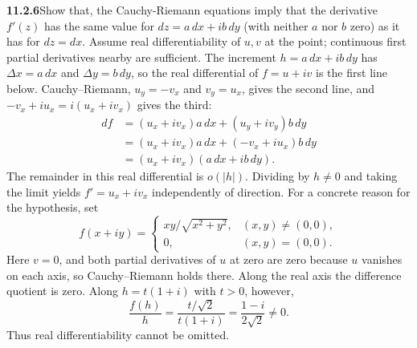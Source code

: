 \par\bigskip
\noindent\textbf{11.2.6}\quad Show that,  the Cauchy-Riemann equations imply that
the derivative $f'(z)$ has the same value for $dz=a\,dx+ib\,dy$ (with neither
$a$ nor $b$ zero) as it has for $dz=dx$.
\solution
Assume real differentiability of $u,v$ at the point; continuous
first partial derivatives nearby are sufficient. The increment
$h=a\,dx+ib\,dy$ has $\Delta x=a\,dx$ and $\Delta y=b\,dy$, so the
real differential of $f=u+iv$ is the first line below.
Cauchy--Riemann, $u_y=-v_x$ and $v_y=u_x$, gives the second line, and
$-v_x+iu_x=i(u_x+iv_x)$ gives the third:
\[
\begin{aligned}
df&=(u_x+iv_x)a\,dx+(u_y+iv_y)b\,dy\\
&=(u_x+iv_x)a\,dx+(-v_x+iu_x)b\,dy\\
&=(u_x+iv_x)(a\,dx+ib\,dy).
\end{aligned}
\]
The remainder in this real differential is $o(|h|)$.
Dividing by $h\ne0$ and taking the limit yields
$\boxed{f'=u_x+iv_x}$ independently of direction.
For a concrete reason for the hypothesis, set
\[
f(x+iy)=\begin{cases}xy/\sqrt{x^2+y^2},&(x,y)\ne(0,0),\\0,&(x,y)=(0,0).\end{cases}
\]
Here $v=0$, and both partial derivatives of $u$ at zero are zero
because $u$ vanishes on each axis, so Cauchy--Riemann holds there.
Along the real axis the difference quotient is zero. Along
$h=t(1+i)$ with $t>0$, however,
\[
\frac{f(h)}h=\frac{t/\sqrt2}{t(1+i)}=\frac{1-i}{2\sqrt2}\ne0.
\]
Thus real differentiability cannot be omitted.

